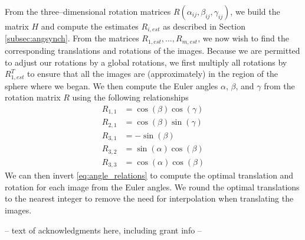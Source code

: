 \documentclass{pnastwo}
\begin{document}
\begin{article}
\begin{materials}
From the three--dimensional rotation matrices $R(\alpha_{ij}, \beta_{ij}, \gamma_{ij})$,
we build the matrix $H$ and compute the estimates $R_{i, est}$ as described in Section \ref{subsec:angsynch}.
%
From the matrices $R_{1, est}, \dots, R_{m, est}$, we now wish to find the corresponding translations and rotations of the images.
%
Because we are permitted to adjust our rotations by a global rotations, we first multiply all rotations by $R_{1, est}^T$ to ensure that all the images are (approximately) in the region of the sphere where we began.
%
We then compute the Euler angles $\alpha$, $\beta$, and $\gamma$ from the rotation matrix $R$ using the following relationships
\begin{equation}
\begin{aligned}
R_{1,1} & = \cos(\beta)\cos(\gamma) \\
R_{2,1} & = \cos(\beta)\sin(\gamma) \\
R_{3,1} & = -\sin(\beta) \\
R_{3,2} & = \sin(\alpha)\cos(\beta) \\
R_{3,3} & = \cos(\alpha)\cos(\beta) 
\end{aligned}
\end{equation}
%
We can then invert \eqref{eq:angle_relations} to compute the optimal translation and rotation for each image from the Euler angles.
%
We round the optimal translations to the nearest integer to remove the need for interpolation when translating the images.  
\end{materials}




\begin{acknowledgments}
-- text of acknowledgments here, including grant info --
\end{acknowledgments}




\end{article}
\end{document}
